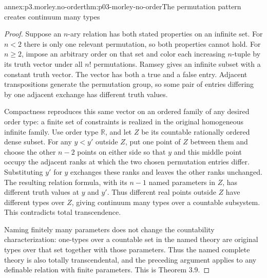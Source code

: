 \begin{annexitem}{annex:p3.morley.no-order}{thm:p03-morley-no-order}{The permutation pattern creates continuum many types}
\begin{proof}
Suppose an \(n\)-ary relation has both stated
properties on an infinite set. For \(n<2\)
there is only one relevant permutation,
so both properties cannot hold. For
\(n\geq2\), impose an arbitrary order
on that set and color each increasing
\(n\)-tuple by its truth vector under all
\(n!\) permutations. Ramsey gives an
infinite subset with a constant truth vector.
The vector has both a true and a false
entry. Adjacent transpositions generate
the permutation group, so some pair of
entries differing by one adjacent exchange
has different truth values.

Compactness reproduces this same vector
on an ordered family of any desired order
type: a finite set of constraints is
realized in the original homogeneous
infinite family. Use order type
\(\mathbb R\), and let \(Z\) be its
countable rationally ordered dense subset.
For any \(y<y'\) outside \(Z\), put
one point of \(Z\) between them and
choose the other \(n-2\) points on either
side so that \(y\) and this middle point
occupy the adjacent ranks at which the
two chosen permutation entries differ.
Substituting \(y'\) for \(y\) exchanges
these ranks and leaves the other ranks
unchanged. The resulting relation formula,
with its \(n-1\) named parameters in
\(Z\), has different truth values at
\(y\) and \(y'\). Thus different real
points outside \(Z\) have different
types over \(Z\), giving continuum
many types over a countable subsystem.
This contradicts total transcendence.

Naming finitely many parameters does not
change the countability characterization:
one-types over a countable set in the
named theory are original types over
that set together with those parameters.
Thus the named complete theory is also
totally transcendental, and the preceding
argument applies to any definable relation
with finite parameters. This is Theorem 3.9.
\end{proof}
\end{annexitem}

